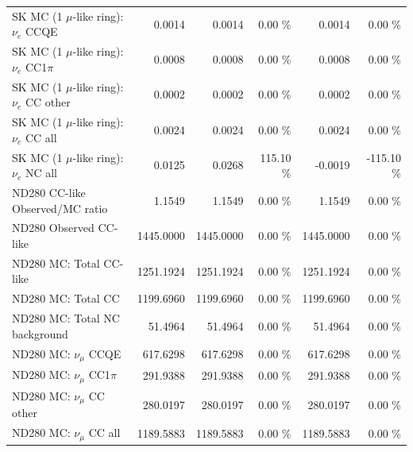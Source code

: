 \begin{table}
\begin{tabular}{| l | r | r  r | r  r |}
                             SK MC (1 $\mu$-like ring): $\nu_{e}$ CCQE &          0.0014 &          0.0014 &  0.00 \%  &          0.0014 &  0.00 \%  \\ 
                         SK MC (1 $\mu$-like ring): $\nu_{e}$ CC1$\pi$ &          0.0008 &          0.0008 &  0.00 \%  &          0.0008 &  0.00 \%  \\ 
                         SK MC (1 $\mu$-like ring): $\nu_{e}$ CC other &          0.0002 &          0.0002 &  0.00 \%  &          0.0002 &  0.00 \%  \\ 
                           SK MC (1 $\mu$-like ring): $\nu_{e}$ CC all &          0.0024 &          0.0024 &  0.00 \%  &          0.0024 &  0.00 \%  \\ 
                           SK MC (1 $\mu$-like ring): $\nu_{e}$ NC all &          0.0125 &          0.0268 & 115.10 \%  &         -0.0019 & -115.10 \%  \\ 
\hline
                                       ND280 CC-like Observed/MC ratio &          1.1549 &          1.1549 &  0.00 \%  &          1.1549 &  0.00 \%  \\ 
                                                ND280 Observed CC-like &       1445.0000 &       1445.0000 &  0.00 \%  &       1445.0000 &  0.00 \%  \\ 
                                               ND280 MC: Total CC-like &       1251.1924 &       1251.1924 &  0.00 \%  &       1251.1924 &  0.00 \%  \\ 
                                                    ND280 MC: Total CC &       1199.6960 &       1199.6960 &  0.00 \%  &       1199.6960 &  0.00 \%  \\ 
                                         ND280 MC: Total NC background &         51.4964 &         51.4964 &  0.00 \%  &         51.4964 &  0.00 \%  \\ 
\hline
                                            ND280 MC: $\nu_{\mu}$ CCQE &        617.6298 &        617.6298 &  0.00 \%  &        617.6298 &  0.00 \%  \\ 
                                        ND280 MC: $\nu_{\mu}$ CC1$\pi$ &        291.9388 &        291.9388 &  0.00 \%  &        291.9388 &  0.00 \%  \\ 
                                        ND280 MC: $\nu_{\mu}$ CC other &        280.0197 &        280.0197 &  0.00 \%  &        280.0197 &  0.00 \%  \\ 
                                          ND280 MC: $\nu_{\mu}$ CC all &       1189.5883 &       1189.5883 &  0.00 \%  &       1189.5883 &  0.00 \%  \\ 

\end{tabular}
\end{table}
